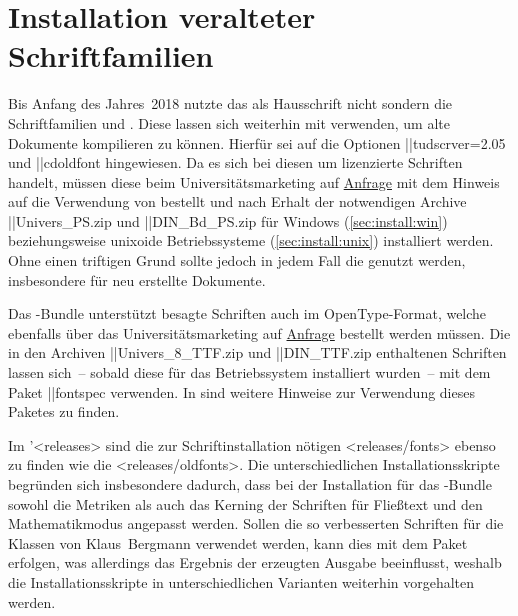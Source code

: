 \section{%
  Installation veralteter Schriftfamilien%
  \label{sec:install:fonts}%
}
%
%
Bis Anfang des Jahres~2018 nutzte das \TUDCD als Hausschrift nicht \OpenSans 
sondern die Schriftfamilien \Univers und \DIN. Diese lassen sich weiterhin mit 
\TUDScript verwenden, um alte Dokumente kompilieren zu können. Hierfür sei auf 
die Optionen \Option||{tudscrver=2.05} und \Option||{cdoldfont} hingewiesen. 
Da es sich bei diesen um lizenzierte Schriften handelt, müssen diese beim 
Universitätsmarketing auf \href{https://tu-dresden.de/cd}{Anfrage} mit dem 
Hinweis auf die Verwendung von  bestellt und nach Erhalt der 
notwendigen Archive \File||{Univers_PS.zip} und \File||{DIN_Bd_PS.zip} für 
Windows (\autoref{sec:install:win}) beziehungsweise unixoide Betriebssysteme 
(\autoref{sec:install:unix}) installiert werden. Ohne einen triftigen Grund 
sollte jedoch in jedem Fall die \OpenSans genutzt werden, insbesondere für neu 
erstellte Dokumente.

Das \TUDScript-Bundle unterstützt besagte Schriften auch im OpenType-Format, 
welche ebenfalls über das Universitätsmarketing auf 
\href{https://tu-dresden.de/cd}{Anfrage} bestellt werden müssen. Die in den 
Archiven \File||{Univers_8_TTF.zip} und \File||{DIN_TTF.zip} enthaltenen 
Schriften lassen sich~-- sobald diese für das Betriebssystem installiert 
wurden~-- mit dem Paket \Package||{fontspec} verwenden. In  
sind weitere Hinweise zur Verwendung dieses Paketes zu finden.

Im \GitHubRepo'<releases> sind die zur Schriftinstallation nötigen 
<releases/fonts> ebenso zu finden wie die
<releases/oldfonts>. Die 
unterschiedlichen Installationsskripte begründen sich insbesondere dadurch, 
dass bei der Installation für das \TUDScript-Bundle sowohl die Metriken als 
auch das Kerning der Schriften für Fließtext und den Mathematikmodus angepasst 
werden. Sollen die so verbesserten Schriften für die Klassen von Klaus~Bergmann 
verwendet werden, kann dies mit dem Paket  erfolgen, 
was allerdings das Ergebnis der erzeugten Ausgabe beeinflusst, weshalb die 
Installationsskripte in unterschiedlichen Varianten weiterhin vorgehalten 
werden.

